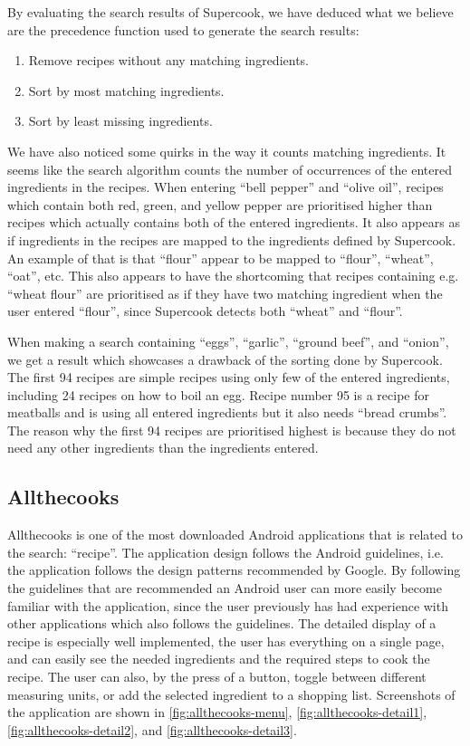 By evaluating the search results of Supercook, we have deduced what we believe are the precedence function used to generate the search results:
\begin{enumerate}
	\item Remove recipes without any matching ingredients.
	\item Sort by most matching ingredients.
	\item Sort by least missing ingredients.
\end{enumerate}
We have also noticed some quirks in the way it counts matching ingredients. It seems like the search algorithm counts the number of occurrences of the entered ingredients in the recipes. When entering ``bell pepper'' and ``olive oil'', recipes which contain both red, green, and yellow pepper are prioritised higher than recipes which actually contains both of the entered ingredients. It also appears as if ingredients in the recipes are mapped to the ingredients defined by Supercook. An example of that is that ``flour'' appear to be mapped to ``flour'', ``wheat'', ``oat'', etc. This also appears to have the shortcoming that recipes containing e.g. ``wheat flour'' are prioritised as if they have two matching ingredient when the user entered ``flour'', since Supercook detects both ``wheat'' and ``flour''.

When making a search containing ``eggs'', ``garlic'', ``ground beef'', and ``onion'', we get a result which showcases a drawback of the sorting done by Supercook. The first 94 recipes are simple recipes using only few of the entered ingredients, including 24 recipes on how to boil an egg. Recipe number 95 is a recipe for meatballs and is using all entered ingredients but it also needs ``bread crumbs''. The reason why the first 94 recipes are prioritised highest is because they do not need any other ingredients than the ingredients entered.

\subsection{Allthecooks}
Allthecooks is one of the most downloaded \cite{allthecooks-googleplay} Android applications that is related to the search: ``recipe''. The application design follows the Android guidelines\cite{guidelines-appstructure}, i.e. the application follows the design patterns recommended by Google. By following the guidelines that are recommended an Android user can more easily become familiar with the application, since the user previously has had experience with other applications which also follows the guidelines. 
The detailed display of a recipe is especially well implemented, the user has everything on a single page, and can easily see the needed ingredients and the required steps to cook the recipe. The user can also, by the press of a button, toggle between different measuring units, or add the selected ingredient to a shopping list. Screenshots of the application are shown in \autoref{fig:allthecooks-menu}, \ref{fig:allthecooks-detail1}, \ref{fig:allthecooks-detail2}, and \ref{fig:allthecooks-detail3}.

